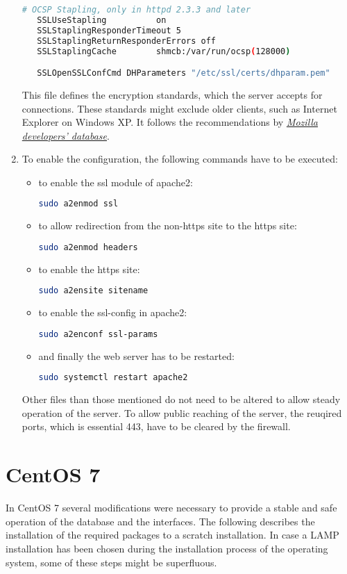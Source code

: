 \begin{enumerate}
\begin{lstlisting}[language=bash]
   # OCSP Stapling, only in httpd 2.3.3 and later
   SSLUseStapling          on
   SSLStaplingResponderTimeout 5
   SSLStaplingReturnResponderErrors off
   SSLStaplingCache        shmcb:/var/run/ocsp(128000)

   SSLOpenSSLConfCmd DHParameters "/etc/ssl/certs/dhparam.pem"
  \end{lstlisting}
  This file defines the encryption standards, which the server accepts for connections. These standards might exclude older clients, such as Internet Explorer on Windows XP. It follows the 
  recommendations by \href{https://wiki.mozilla.org/Security/Server_Side_TLS}{\textit{Mozilla developers' database}}.
  \item To enable the configuration, the following commands have to be executed:
  \begin{itemize}
  \item to enable the ssl module of apache2:
  \begin{lstlisting}[language=bash]
   sudo a2enmod ssl
  \end{lstlisting}
  \item to allow redirection from the non-https site to the https site:
  \begin{lstlisting}[language=bash]
   sudo a2enmod headers
  \end{lstlisting}
  \item to enable the https site:
  \begin{lstlisting}[language=bash]
   sudo a2ensite sitename
  \end{lstlisting}
  \item to enable the ssl-config in apache2:
  \begin{lstlisting}[language=bash]
   sudo a2enconf ssl-params
  \end{lstlisting}
  \item and finally the web server has to be restarted:
  \begin{lstlisting}[language=bash]
   sudo systemctl restart apache2
  \end{lstlisting}
  \end{itemize}
  Other files than those mentioned do not need to be altered to allow steady operation of the server. To allow public reaching of the server, the reuqired ports, 
  which is essential 443, have to be cleared by the firewall.
\end{enumerate}

\section{CentOS 7}
In CentOS 7 several modifications were necessary to provide a stable and safe operation of the database and the interfaces. The following describes the installation of the required
packages to a scratch installation. In case a LAMP installation has been chosen during the installation process of the operating system, some of these steps might be superfluous. 
